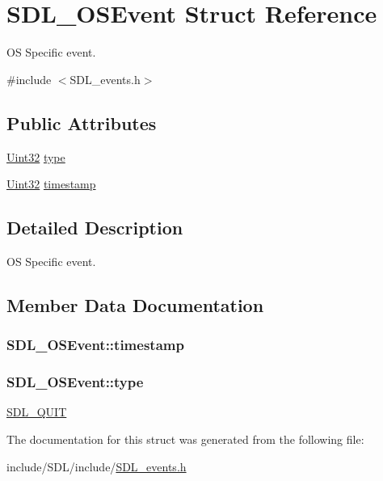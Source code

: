 \hypertarget{struct_s_d_l___o_s_event}{\section{S\-D\-L\-\_\-\-O\-S\-Event Struct Reference}
\label{struct_s_d_l___o_s_event}
}


O\-S Specific event.  




{\ttfamily \#include $<$S\-D\-L\-\_\-events.\-h$>$}

\subsection*{Public Attributes}
\begin{DoxyCompactItemize}
\item 
\hyperlink{_s_d_l__stdinc_8h_add440eff171ea5f55cb00c4a9ab8672d}{Uint32} \hyperlink{struct_s_d_l___o_s_event_a85a600619ebebc8db007fc757b3895a5}{type}
\item 
\hyperlink{_s_d_l__stdinc_8h_add440eff171ea5f55cb00c4a9ab8672d}{Uint32} \hyperlink{struct_s_d_l___o_s_event_a8b2480eefadad9f3f8c94f8e550b7fb0}{timestamp}
\end{DoxyCompactItemize}


\subsection{Detailed Description}
O\-S Specific event. 

\subsection{Member Data Documentation}
\hypertarget{struct_s_d_l___o_s_event_a8b2480eefadad9f3f8c94f8e550b7fb0}{
\subsubsection[{timestamp}]{ S\-D\-L\-\_\-\-O\-S\-Event\-::timestamp}}\label{struct_s_d_l___o_s_event_a8b2480eefadad9f3f8c94f8e550b7fb0}
\hypertarget{struct_s_d_l___o_s_event_a85a600619ebebc8db007fc757b3895a5}{
\subsubsection[{type}]{ S\-D\-L\-\_\-\-O\-S\-Event\-::type}}\label{struct_s_d_l___o_s_event_a85a600619ebebc8db007fc757b3895a5}
\hyperlink{_s_d_l__events_8h_a3b589e89be6b35c02e0dd34a55f3fccaa31acc5fdafc86ebe2c1f5c3cae48d603}{S\-D\-L\-\_\-\-Q\-U\-I\-T} 

The documentation for this struct was generated from the following file\-:\begin{DoxyCompactItemize}
\item 
include/\-S\-D\-L/include/\hyperlink{_s_d_l__events_8h}{S\-D\-L\-\_\-events.\-h}\end{DoxyCompactItemize}
